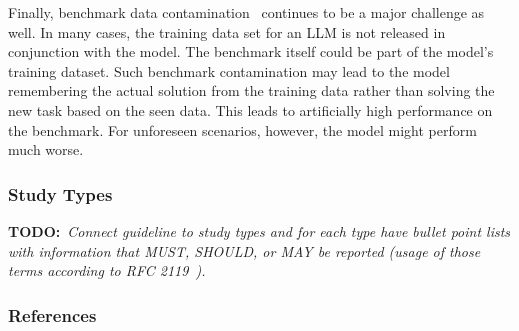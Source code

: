 \documentclass[11pt]{article}
\newcommand{\todo}[1]{{\textbf{TODO:}\ \textit{#1}}} %
\begin{document}
Finally, benchmark data contamination~\cite{DBLP:journals/corr/abs-2406-04244} continues to be a major challenge as well.
In many cases, the training data set for an LLM is not released in conjunction with the model.
The benchmark itself could be part of the model's training dataset.
Such benchmark contamination may lead to the model remembering the actual solution from the training data rather than solving the new task based on the seen data.
This leads to artificially high performance on the benchmark.
For unforeseen scenarios, however, the model might perform much worse.



\subsubsection{Study Types}

\todo{Connect guideline to study types and for each type have bullet point lists with information that MUST, SHOULD, or MAY be reported (usage of those terms according to RFC 2119~\cite{rfc2119}).}

\subsubsection{References}



\end{document}
